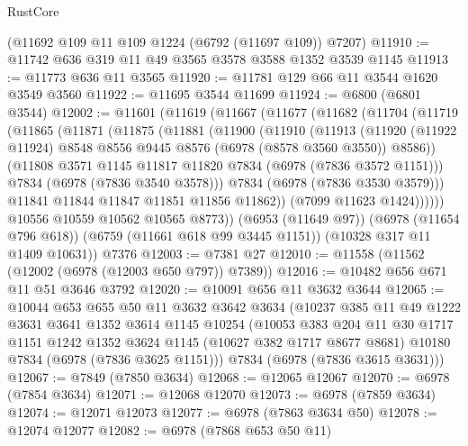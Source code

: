 \begin{lexlean}{RustCore}
\begin{coremodule}
    (@11692 @109 @11 @109 @1224 (@6792 (@11697 @109)) @7207)
@11910 := @11742 @636 @319 @11 @49 @3565 @3578 @3588 @1352 @3539 @1145
@11913 := @11773 @636 @11 @3565
@11920 := @11781 @129 @66 @11 @3544 @1620 @3549 @3560
@11922 := @11695 @3544 @11699
@11924 := @6800 (@6801 @3544)
@12002 := @11601
    (@11619
      (@11667
        (@11677
          (@11682
            (@11704
              (@11719
                (@11865
                  (@11871
                    (@11875
                      (@11881
                        (@11900
                          (@11910
                            (@11913
                              (@11920
                                (@11922 @11924)
                                @8548
                                @8556
                                @9445
                                @8576
                                (@6978 (@8578 @3560 @3550))
                                @8586))
                            (@11808 @3571 @1145 @11817 @11820 @7834 (@6978 (@7836 @3572 @1151)))
                            @7834
                            (@6978 (@7836 @3540 @3578)))
                          @7834
                          (@6978 (@7836 @3530 @3579)))
                        @11841
                        @11844
                        @11847
                        @11851
                        @11856
                        @11862))
                    (@7099 @11623 @1424))))))
          @10556
          @10559
          @10562
          @10565
          @8773))
      (@6953 (@11649 @97))
      (@6978 (@11654 @796 @618))
      (@6759 (@11661 @618 @99 @3445 @1151))
      (@10328 @317 @11 @1409 @10631))
    @7376
@12003 := @7381 @27
@12010 := @11558 (@11562 (@12002 (@6978 (@12003 @650 @797)) @7389))
@12016 := @10482 @656 @671 @11 @51 @3646 @3792
@12020 := @10091 @656 @11 @3632 @3644
@12065 := @10044
    @653
    @655
    @50
    @11
    @3632
    @3642
    @3634
    (@10237
      @385
      @11
      @49
      @1222
      @3631
      @3641
      @1352
      @3614
      @1145
      @10254
      (@10053
        @383
        @204
        @11
        @30
        @1717
        @1151
        @1242
        @1352
        @3624
        @1145
        (@10627 @382 @1717 @8677 @8681)
        @10180
        @7834
        (@6978 (@7836 @3625 @1151)))
      @7834
      (@6978 (@7836 @3615 @3631)))
@12067 := @7849 (@7850 @3634)
@12068 := @12065 @12067
@12070 := @6978 (@7854 @3634)
@12071 := @12068 @12070
@12073 := @6978 (@7859 @3634)
@12074 := @12071 @12073
@12077 := @6978 (@7863 @3634 @50)
@12078 := @12074 @12077
@12082 := @6978 (@7868 @653 @50 @11)

\end{coremodule}
\end{lexlean}
